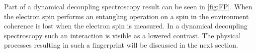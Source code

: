 Part of a dynamical decoupling spectroscopy result can be seen in \cref{fig:FP}.
When the electron spin performs an entangling operation on a spin in the environment coherence is lost when the electron spin is measured.
In a dynamical decoupling spectroscopy such an interaction is visible as a lowered contrast.
The physical processes resulting in such a fingerprint will be discussed in the next section.

\begin{figure}[htbp]

    \begin{subfigure}[t]{\textwidth}\centering
        \caption{}
        \label{fig:FP16}
    \end{subfigure}

    \begin{subfigure}[t]{\textwidth}\centering


\end{subfigure}
\end{figure}
